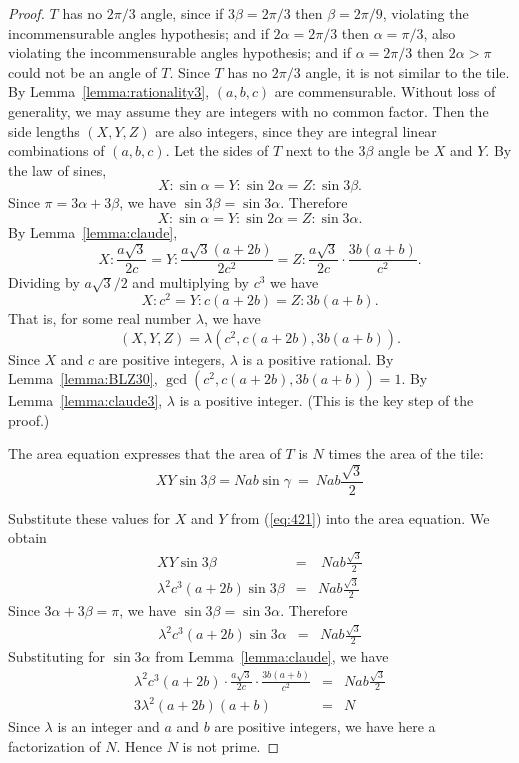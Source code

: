 \documentclass{amsart}
\theoremstyle{plain}
\theoremstyle{definition}
\theoremstyle{remark}
\begin{document}
\begin{proof} $T$ has no $2\pi/3$ angle, since if $3\beta = 2\pi/3$ then $\beta = 2\pi/9$,
violating the incommensurable angles hypothesis; and if $2\alpha = 2\pi/3$ then $\alpha = \pi/3$,
also violating the incommensurable angles hypothesis; and if $\alpha = 2\pi/3$ then $2\alpha > \pi$
could not be an angle of $T$.
Since $T$ has no $2\pi/3$ angle, it is not similar to the tile.
By Lemma~\ref{lemma:rationality3}, $(a,b,c)$ are commensurable.
Without loss of generality, we may assume they are integers with no common factor.
Then the side lengths $(X,Y,Z)$ are also integers, since they are integral linear
combinations of $(a,b,c)$. 
Let the sides of $T$ next to the $3\beta$ angle be $X$ and $Y$. 
By the law of sines,
$$ X: {\sin \alpha} =   Y :{\sin 2 \alpha} = Z :{\sin 3 \beta}.$$
Since $\pi = 3 \alpha + 3\beta$, we have $\sin 3\beta = \sin 3 \alpha$.   Therefore
$$ X: {\sin \alpha} =   Y :{\sin 2 \alpha} = Z : {\sin 3 \alpha}.$$
By Lemma~\ref{lemma:claude},
$$ X : \frac {a \sqrt 3}{2c} = Y:\frac {a \sqrt 3 (a+2b)}{2c^2} = Z: \frac {a \sqrt 3}{2c} \cdot \frac{3b(a+b)}{c^2}.$$
Dividing by $a \sqrt{3}/2$ and multiplying by $c^3$ we have
$$ X : c^2 = Y: c(a+2b) = Z:  {3b(a+b)}.$$
That is, for some real number $\lambda$, we have 
\begin{equation}
 (X,Y,Z) = \lambda(c^2,c(a+2b),3b(a+b)). \label{eq:421}
 \end{equation}
Since $X$ and $c$ are positive integers, $\lambda$ is a positive rational.
By Lemma~\ref{lemma:BLZ30}, $\gcd(c^2,c(a+2b),3b(a+b)) = 1$. 
By Lemma~\ref{lemma:claude3}, $\lambda$ is a positive integer.
(This is the key step of the proof.)

 The area equation expresses that the area of $T$ is $N$ times the area of the tile:
\begin{equation*}
XY \sin 3\beta = N ab \sin \gamma \ = \ N ab \frac {\sqrt 3} 2  
\end{equation*}

Substitute these values for $X$ and $Y$ from (\ref{eq:421}) into the area equation.
We obtain
\begin{eqnarray*}
XY \sin 3\beta &=& \ N ab \frac {\sqrt 3} 2  \\
\lambda^2 c^3(a+2b)\sin 3 \beta &=& Nab \frac{\sqrt 3} 2
\end{eqnarray*}
Since $3\alpha+3\beta =\pi$, we have $\sin 3 \beta = \sin 3 \alpha$.  Therefore
\begin{eqnarray*}
\lambda^2 c^3(a+2b)\sin 3 \alpha &=& Nab \frac{\sqrt 3} 2
\end{eqnarray*}
Substituting for $\sin 3 \alpha$ from Lemma~\ref{lemma:claude}, we have
\begin{eqnarray*}
\lambda^2 c^3(a+2b) \cdot \frac {a \sqrt 3}{2c} \cdot \frac {3b(a+b)}{c^2} &=& Nab \frac{\sqrt 3} 2 \\
 3\lambda^2 (a+2b)  (a+b) &=& N
\end{eqnarray*}
Since $\lambda$ is an integer and $a$ and $b$ are positive integers, we have here a factorization of $N$.
Hence $N$ is not prime.
\end{proof}
\end{document}
